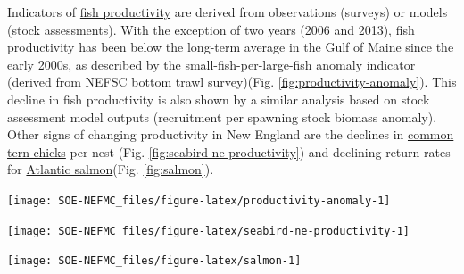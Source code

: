 \documentclass[
  10pt,
]{article}
\let\origfigure\figure
\let\endorigfigure\endfigure
\renewenvironment{figure}[1][2] {
    \expandafter\origfigure\expandafter[H]
} {
    \endorigfigure
}
\begin{document}
Indicators of \href{https://noaa-edab.github.io/catalog/fish-productivity-indicators.html}{fish productivity} are derived from observations (surveys) or models (stock assessments). With the exception of two years (2006 and 2013), fish productivity has been below the long-term average in the Gulf of Maine since the early 2000s, as described by the small-fish-per-large-fish anomaly indicator (derived from NEFSC bottom trawl survey)(Fig. \ref{fig:productivity-anomaly}). This decline in fish productivity is also shown by a similar analysis based on stock assessment model outputs (recruitment per spawning stock biomass anomaly). Other signs of changing productivity in New England are the declines in \href{https://noaa-edab.github.io/catalog/seabird-diet-and-productivity---new-england.html}{common tern chicks} per nest (Fig. \ref{fig:seabird-ne-productivity}) and declining return rates for \href{https://noaa-edab.github.io/catalog/gulf-of-maine-atlantic-salmon.html}{Atlantic salmon}(Fig. \ref{fig:salmon}).

\begin{figure}

{\centering \texttt{[image: SOE-NEFMC\_files/figure-latex/productivity-anomaly-1]} 

}

\caption{Fish productivity measures. Left: Small fish per large fish survey biomass anomaly in the Gulf of Maine. Right: assessment recruitment per spawning stock biomass anomaly for stocks managed by the New England Fishery Management Council region. The summed anomaly across species is shown by the black line, drawn across all years with the same number of stocks analyzed.}\label{fig:productivity-anomaly}
\end{figure}
\begin{figure}

{\centering \texttt{[image: SOE-NEFMC\_files/figure-latex/seabird-ne-productivity-1]} 

}

\caption{Productivity of Common terns in the Gulf of Maine.}\label{fig:seabird-ne-productivity}
\end{figure}
\begin{figure}

{\centering \texttt{[image: SOE-NEFMC\_files/figure-latex/salmon-1]} 

}

\caption{Return rate proportions and abundance of Atlantic salmon.}\label{fig:salmon}
\end{figure}
\end{document}

